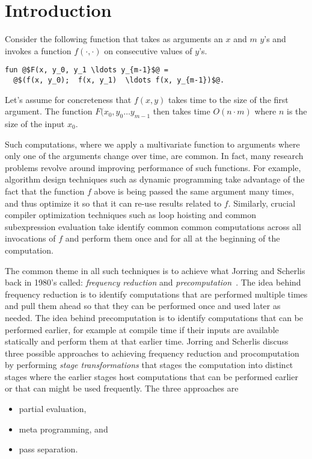 \section{Introduction}

Consider the following function that takes as arguments an $x$ and $m$
$y$'s and invokes a function $f(\cdot, \cdot)$ on consecutive
values of $y$'s.
\begin{lstlisting}
fun @$F(x, y_0, y_1 \ldots y_{m-1}$@ = 
  @$(f(x, y_0);  f(x, y_1)  \ldots f(x, y_{m-1})$@.
\end{lstlisting}
Let's assume for concreteness that $f(x,y)$ takes time to the size of
the first argument.  The function $F(x_0, y_0 \ldots y_{m-1}$ then
takes time $O(n \cdot m)$ where $n$ is the size of the input $x_0$.

Such computations, where we apply a multivariate function to arguments
where only one of the arguments change over time, are common.  In
fact, many research problems revolve around improving performance of
such functions.  For example, algorithm design techniques such as
dynamic programming take advantage of the fact that the function $f$
above is being passed the same argument many times, and thus optimize
it so that it can re-use results related to $f$.  Similarly, 
crucial compiler optimization techniques such as loop hoisting and
common subexpression evaluation take identify common common
computations across all invocations of $f$ and perform them once and
for all at the beginning of the computation.

The common theme in all such techniques is to achieve what Jorring and
Scherlis back in 1980's called: {\em frequency reduction} and {\em
  precomputation}~\cite{JS86-staging}.  The idea behind frequency
reduction is to identify computations that are performed multiple
times and pull them ahead so that they can be performed once and used
later as needed.  The idea behind precomputation is to identify
computations that can be performed earlier, for example at compile
time if their inputs are available statically and perform them at that
earlier time.  Jorring and Scherlis discuss three possible approaches
to achieving frequency reduction and procomputation by performing {\em
  stage transformations} that stages the computation into distinct
stages where the earlier stages host computations that can be
performed earlier or that can might be used frequently.  The three
approaches are
\begin{itemize}
\item 
partial evaluation,

\item
meta programming, and

\item 
pass separation.

\end{itemize}

